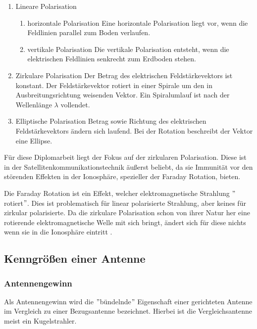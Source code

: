 \begin{enumerate}
	\item Lineare Polarisation
	\begin{enumerate}
		\item horizontale Polarisation
		Eine horizontale Polarisation liegt vor, wenn die Feldlinien parallel zum Boden verlaufen.
		\item vertikale Polarisation
		Die vertikale Polarisation entsteht, wenn die elektrischen Feldlinien senkrecht zum Erdboden stehen.
	\end{enumerate}
	\item Zirkulare Polarisation
	Der Betrag des elektrischen Feldstärkevektors ist konstant. Der Feldstärkevektor rotiert in einer Spirale um den in Ausbreitungsrichtung weisenden Vektor. Ein Spiralumlauf ist nach der Wellenlänge $\lambda$ vollendet.
	\item Elliptische Polarisation
	Betrag sowie Richtung des elektrischen Feldstärkevektors ändern sich laufend. Bei der Rotation beschreibt der Vektor eine Ellipse\cite[p. 70]{Kraus-2002-AntennasB}.
\end{enumerate}

Für diese Diplomarbeit liegt der Fokus auf der zirkularen Polarisation. Diese ist in der Satellitenkommunikationstechnik äußerst beliebt, da sie Immunität vor den störenden Effekten in der Ionosphäre, spezieller der Faraday Rotation, bieten.

Die Faraday Rotation ist ein Effekt, welcher elektromagnetische Strahlung $"$rotiert$"$. Dies ist problematisch für linear polarisierte Strahlung, aber keines für zirkular polarisierte. Da die zirkulare Polarisation schon von ihrer Natur her eine rotierende elektromagnetische Welle mit sich bringt, ändert sich für diese nichts wenn sie in die Ionosphäre eintritt \cite{takashi_encyclopedia_2003}.

\subsection{Kenngrößen einer Antenne}

\subsubsection{Antennengewinn}
Als Antennengewinn wird die $"$bündelnde$"$ Eigenschaft einer gerichteten Antenne im Vergleich zu einer Bezugsantenne bezeichnet. Hierbei ist die Vergleichsantenne meist ein Kugelstrahler.\\

